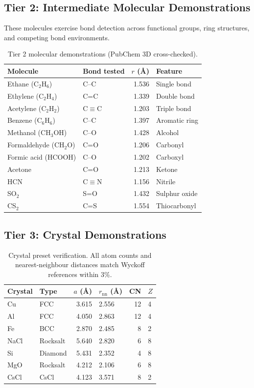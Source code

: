\documentclass[11pt,twoside]{article}
\begin{document}
\subsection{Tier 2: Intermediate Molecular Demonstrations}

These molecules exercise bond detection across functional groups, ring
structures, and competing bond environments.

\begin{table}[H]
\centering
\caption{Tier 2 molecular demonstrations (PubChem 3D cross-checked).}
\label{tab:tier2}
\begin{tabular}{llrl}
\toprule
\textbf{Molecule} & \textbf{Bond tested} & \textbf{$r$ (\AA)} & \textbf{Feature} \\
\midrule
Ethane (C$_2$H$_6$) & C--C & 1.536 & Single bond \\
Ethylene (C$_2$H$_4$) & C=C & 1.339 & Double bond \\
Acetylene (C$_2$H$_2$) & C$\equiv$C & 1.203 & Triple bond \\
Benzene (C$_6$H$_6$) & C--C & 1.397 & Aromatic ring \\
Methanol (CH$_3$OH) & C--O & 1.428 & Alcohol \\
Formaldehyde (CH$_2$O) & C=O & 1.206 & Carbonyl \\
Formic acid (HCOOH) & C--O & 1.202 & Carboxyl \\
Acetone & C=O & 1.213 & Ketone \\
HCN & C$\equiv$N & 1.156 & Nitrile \\
SO$_2$ & S=O & 1.432 & Sulphur oxide \\
CS$_2$ & C=S & 1.554 & Thiocarbonyl \\
\bottomrule
\end{tabular}
\end{table}

\subsection{Tier 3: Crystal Demonstrations}

\begin{table}[H]
\centering
\caption{Crystal preset verification.  All atom counts and nearest-neighbour
distances match Wyckoff references within 3\%.}
\label{tab:crystals}
\begin{tabular}{llrlrl}
\toprule
\textbf{Crystal} & \textbf{Type} & \textbf{$a$ (\AA)} & \textbf{$r_{\mathrm{nn}}$ (\AA)} & \textbf{CN} & \textbf{$Z$} \\
\midrule
Cu  & FCC      & 3.615 & 2.556 & 12 & 4 \\
Al  & FCC      & 4.050 & 2.863 & 12 & 4 \\
Fe  & BCC      & 2.870 & 2.485 & 8  & 2 \\
NaCl & Rocksalt & 5.640 & 2.820 & 6  & 8 \\
Si  & Diamond  & 5.431 & 2.352 & 4  & 8 \\
MgO & Rocksalt & 4.212 & 2.106 & 6  & 8 \\
CsCl & CsCl    & 4.123 & 3.571 & 8  & 2 \\
\bottomrule
\end{tabular}
\end{table}
\end{document}
